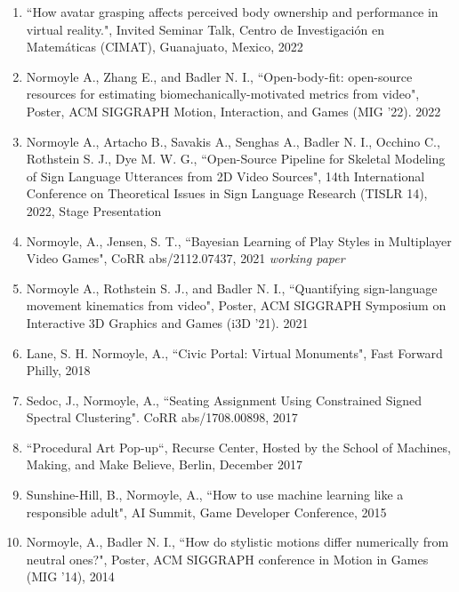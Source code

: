 \begin{enumerate}[leftmargin=*]

\item ``How avatar grasping affects perceived body ownership and performance in virtual reality.", Invited Seminar Talk, Centro de Investigaci\'{o}n en Matem\'{a}ticas (CIMAT), Guanajuato, Mexico, 2022

\item Normoyle A., Zhang E., and Badler N. I., ``Open-body-fit: open-source resources for estimating biomechanically-motivated metrics from video", Poster, ACM SIGGRAPH Motion, Interaction, and Games (MIG ’22). 2022

\item Normoyle A., Artacho B., Savakis A., Senghas A., Badler N. I., Occhino C., Rothstein S. J., Dye M. W. G., ``Open-Source Pipeline for Skeletal Modeling of Sign Language Utterances from 2D Video Sources", 14th International Conference on Theoretical Issues in Sign Language Research (TISLR 14), 2022, Stage Presentation

\item Normoyle, A., Jensen, S. T., ``Bayesian Learning of Play Styles in Multiplayer Video Games", CoRR abs/2112.07437, 2021 \emph{working paper}

\item Normoyle A., Rothstein S. J., and Badler N. I., ``Quantifying sign-language movement kinematics from video", Poster, ACM SIGGRAPH Symposium on Interactive 3D Graphics and Games (i3D ’21). 2021

\item Lane, S. H. Normoyle, A., ``Civic Portal: Virtual Monuments", Fast Forward Philly, 2018

\item Sedoc, J., Normoyle, A., ``Seating Assignment Using Constrained Signed Spectral Clustering". CoRR abs/1708.00898, 2017 

\item ``Procedural Art Pop-up``, Recurse Center, Hosted by the School of Machines, Making, and Make Believe, Berlin, December 2017 

\item Sunshine-Hill, B., Normoyle, A., ``How to use machine learning like a responsible adult", AI Summit, Game Developer Conference, 2015

\item Normoyle, A., Badler N. I., ``How do stylistic motions differ numerically from neutral ones?", Poster, ACM SIGGRAPH conference in Motion in Games (MIG '14), 2014


\end{enumerate}
